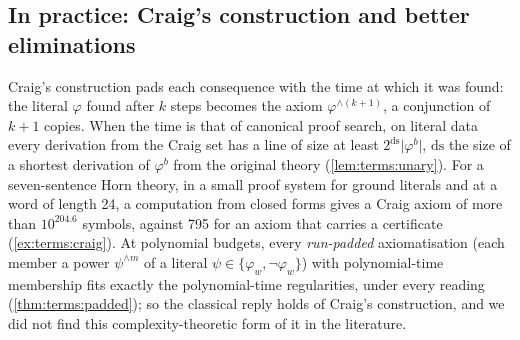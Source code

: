 \subsection{In practice: Craig's construction and better eliminations}\label{sec:terms:craig}

Craig's construction pads each consequence with the time at which it was found: the literal $\varphi$ found after $k$ steps becomes the axiom $\varphi^{\wedge(k+1)}$, a conjunction of $k+1$ copies. When the time is that of canonical proof search, on literal data every derivation from the Craig set has a line of size at least $2^{\mathrm{ds}}\lvert\varphi^b\rvert$, $\mathrm{ds}$ the size of a shortest derivation of $\varphi^b$ from the original theory (\cref{lem:terms:unary}). For a seven-sentence Horn theory, in a small proof system for ground literals and at a word of length 24, a computation from closed forms gives a Craig axiom of more than $10^{204.6}$ symbols, against 795 for an axiom that carries a certificate (\cref{ex:terms:craig}). At polynomial budgets, every \emph{run-padded} axiomatisation (each member a power $\psi^{\wedge m}$ of a literal $\psi\in\{\varphi_w,\neg\varphi_w\}$) with polynomial-time membership fits exactly the polynomial-time regularities, under every reading (\cref{thm:terms:padded}); so the classical reply holds of Craig's construction, and we did not find this complexity-theoretic form of it in the literature.

